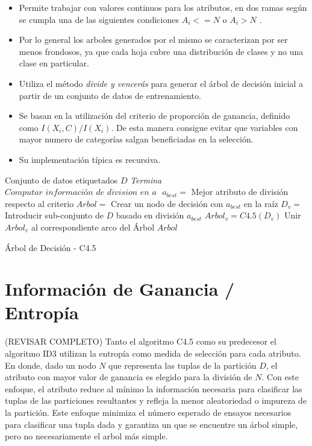 \begin{itemize}
	\item Permite trabajar con valores continuos para los atributos, en dos ramas según se cumpla una de las siguientes condiciones  $ A_{i} <= N $ o $ A_{i} > N $ . 
	\item Por lo general los arboles generados por el mismo se caracterizan por ser menos frondosos, ya que cada hoja cubre una distribución de clases y no una clase en particular.
	\item Utiliza el método \emph{divide y vencerás} para generar el árbol de decisión inicial a partir de un conjunto de datos de entrenamiento.
	\item Se basan en la utilización del criterio de proporción de ganancia, definido como $ I(X_{i},C) / I(X_{i})  $. De esta manera consigue evitar que variables con mayor numero de categorías salgan beneficiadas en la selección. 
	\item Su implementación típica es recursiva.
\end{itemize}

\begin{algorithm}
	\begin{algorithmic}[1]
		\Require Conjunto de datos etiquetados $D$
				\State\textit{Termina}
			\EndIf
				\State $\textit{Computar información de division en a }$
			\EndFor
			\State $ a_{best} =$ Mejor atributo de división respecto al criterio 
			\State $ Arbol =$ Crear un nodo de decisión con $ a_{best} $ en la raíz 
			\State $ D_{v} =$ Introducir sub-conjunto de $D$ basado en división $ a_{best} $
				\State $ Arbol_{v} = C4.5(D_{v}) $
				\State Unir $ Arbol_{v} $ al correspondiente arco del Árbol
			\EndFor
			\State 
			\Return $ Arbol $
		\EndProcedure
	\end{algorithmic}
	\caption{\label{algoC45}Árbol de Decisión - C4.5}
\end{algorithm}


\section{Información de Ganancia / Entropía} (REVISAR COMPLETO)
Tanto el algoritmo C4.5 como su predecesor el algoritmo ID3 utilizan la entropía como medida de selección para cada atributo.
En donde, dado un nodo $N$ que representa las tuplas de la partición $D$, el atributo con mayor valor de ganancia es elegido para la división de $N$. Con este enfoque, el atributo reduce al mínimo la información necesaria para clasificar las tuplas de las particiones resultantes y refleja la menor aleatoriedad o impureza de la partición. Este enfoque minimiza el número esperado de ensayos necesarios para clasificar una tupla dada y garantiza un que se encuentre un árbol simple, pero no necesariamente el arbol más simple.

